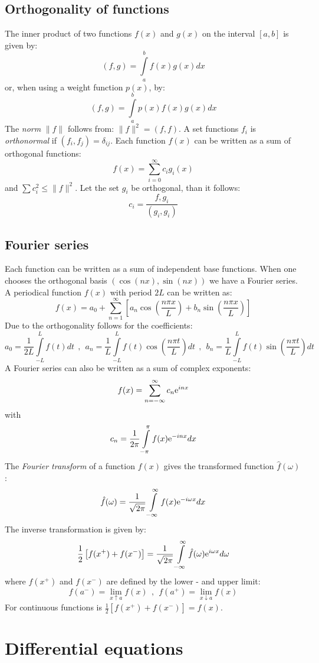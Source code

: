 \documentclass[a4paper,fancyheadings,twoside]{report}
\begin{document}
\section{Orthogonality of functions}
The inner product of two functions $f(x)$ and $g(x)$ on the interval $[a,b]$
is given by:
\[
(f,g)=\int\limits_a^bf(x)g(x)dx
\]
or, when using a weight function $p(x)$, by:
\[
(f,g)=\int\limits_a^bp(x)f(x)g(x)dx
\]
The {\it norm} $\|f\|$ follows from: $\|f\|^2=(f,f)$. A set functions $f_i$
is {\it orthonormal} if $(f_i,f_j)=\delta_{ij}$.
\npar
Each function $f(x)$ can be written as a sum of orthogonal functions:
\[
f(x)=\sum_{i=0}^\infty c_ig_i(x)
\]
and $\sum c_i^2\leq\|f\|^2$. Let the set $g_i$ be orthogonal, than it follows:
\[
c_i=\frac{f,g_i}{(g_i,g_i)}
\]

\section{Fourier series}
Each function can be written as a sum of independent base functions. When one
chooses the orthogonal basis $(\cos(nx),\sin(nx))$ we have a Fourier series.
\npar
A periodical function $f(x)$ with period $2L$ can be written as:
\[
f(x)=a_0+\sum_{n=1}^\infty\left[a_n\cos\left(\frac{n\pi x}{L}\right)+b_n\sin\left(\frac{n\pi x}{L}\right)\right]
\]
Due to the orthogonality follows for the coefficients:
\[
a_0=\frac{1}{2L}\int\limits_{-L}^Lf(t)dt~~,~~
a_n=\frac{1}{L}\int\limits_{-L}^Lf(t)\cos\left(\frac{n\pi t}{L}\right)dt~~,~~
b_n=\frac{1}{L}\int\limits_{-L}^Lf(t)\sin\left(\frac{n\pi t}{L}\right)dt
\]
A Fourier series can also be written as a sum of complex exponents:
\[
f(x)=\sum_{n=-\infty}^\infty c_n{\rm e}^{inx}
\]
with
\[
c_n=\frac{1}{2\pi}\int\limits_{-\pi}^\pi f(x){\rm e}^{-inx}dx
\]
The {\it Fourier transform} of a function $f(x)$ gives the transformed function
$\hat{f}(\omega)$:
\[
\hat{f}(\omega)=\frac{1}{\sqrt{2\pi}}\int\limits_{-\infty}^\infty f(x){\rm e}^{-i\omega x}dx
\]
The inverse transformation is given by:
\[
\frac{1}{2}\left[f(x^+)+f(x^-)\right]=\frac{1}{\sqrt{2\pi}}\int\limits_{-\infty}^\infty\hat{f}(\omega){\rm e}^{i\omega x}d\omega
\]
where $f(x^+)$ and $f(x^-)$ are defined by the lower - and upper limit:
\[
f(a^-)=\lim_{x\uparrow a}f(x)~~,~~f(a^+)=\lim_{x\downarrow a}f(x)
\]
For continuous functions is $\frac{1}{2}\left[f(x^+)+f(x^-)\right]=f(x)$.

\chapter{Differential equations}
\end{document}
